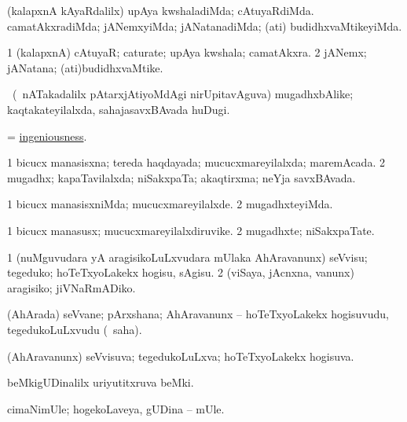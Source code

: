 \bentry
{}
\gl{\kirxvi}
\bmng
(kalapxnA kAyaRdalilx) 
\banum
{} upAya kwshaladiMda; cAtuyaRdiMda. 
 camatAkxradiMda; jANemxyiMda; jANatanadiMda; (ati) budidhxvaMtikeyiMda. 
\eanum
\emng
\eentry

\bentry
{}
\gl{\nA}
\bmng
\bnum
\num{1} (kalapxnA) cAtuyaR; caturate; upAya kwshala; camatAkxra. 
\num{2} jANemx; jANatana; (ati)budidhxvaMtike. 
\enum
\emng
\eentry

\bentry
{}
\gl{\nA}
\bmng
\F\ (\kanmu\ nATakadalilx pAtarxjAtiyoMdAgi nirUpitavAguva) mugadhxbAlike; kaqtakateyilalxda, sahajasavxBAvada huDugi. 
\emng
\eentry

\bentry
{}
\gl{\nA}
\bmng
 = \hyperlink{ingeniousness}{ingeniousness}. 
\emng
\eentry

\bentry
{}
\gl{\gu}
\bmng
\bnum
\num{1} bicucx manasisxna; tereda haqdayada; mucucxmareyilalxda; maremAcada. 
\num{2} mugadhx; kapaTavilalxda; niSakxpaTa; akaqtirxma; neYja savxBAvada. 
\enum
\emng
\eentry

\bentry
{}
\gl{\kirxvi}
\bmng
\bnum
\num{1} bicucx manasisxniMda; mucucxmareyilalxde. 
\num{2} mugadhxteyiMda. 
\enum
\emng
\eentry

\bentry
{}
\gl{\nA}
\bmng
\bnum
\num{1} bicucx manasusx; mucucxmareyilalxdiruvike. 
\num{2} mugadhxte; niSakxpaTate. 
\enum
\emng
\eentry

\bentry
{}
\gl{\sakirx}
\bmng
\bnum
\num{1} (nuMguvudara yA aragisikoLuLxvudara mUlaka AhAravanunx) seVvisu; tegeduko; hoTeTxyoLakekx hogisu, sAgisu. 
\num{2} (viSaya, jAcnxna, \mo vanunx) aragisiko; jiVNaRmADiko. 
\enum
\emng
\eentry

\bentry
{}
\gl{\nA}
\bmng
(AhArada) seVvane; pArxshana; AhAravanunx -- hoTeTxyoLakekx hogisuvudu, tegedukoLuLxvudu (\rUpa\ saha). 
\emng
\eentry

\bentry
{}
\gl{\gu}
\bmng
(AhAravanunx) seVvisuva; tegedukoLuLxva; hoTeTxyoLakekx hogisuva. 
\emng
\eentry

\bentry
{}
\gl{\nA}
\bmng
beMkigUDinalilx uriyutitxruva beMki. 
\emng
\eentry

\bentry
{}
\gl{\nA}
\bmng
cimaNimUle; hogekoLaveya, gUDina -- mUle. 
\emng
\eentry

